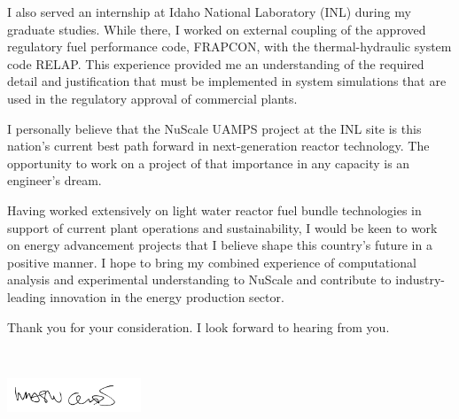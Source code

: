 \documentclass[11pt,letterpaper,roman]{moderncv}        %
\makeatletter
\renewcommand*{\makeletterclosing}{
	\@closing\\[0em]%
	{\includegraphics[width=4cm]{signature_childs}
		\par
		\bfseries \@firstname~\@lastname}%
		\\
	\ifthenelse{\isundefined{\@enclosure}}{}{%
		\vfill%
		{\color{color2}\itshape\enclname: \@enclosure}}}
\makeatother
\begin{document}
I also served an internship at Idaho National Laboratory (INL) during my graduate studies. While there, I worked on external coupling of the approved regulatory fuel performance code, FRAPCON, with the thermal-hydraulic system code RELAP. This experience provided me an understanding of the required detail and justification that must be implemented in system simulations that are used in the regulatory approval of commercial plants.

I personally believe that the NuScale UAMPS project at the INL site is this nation's current best path forward in next-generation reactor technology. The opportunity to work on a project of that importance in any capacity is an engineer's dream.

Having worked extensively on light water reactor fuel bundle technologies in support of current plant operations and sustainability, I would be keen to work on energy advancement projects that I believe shape this country’s future in a positive manner. I hope to bring my combined experience of computational analysis and experimental understanding to NuScale and contribute to industry-leading innovation in the energy production sector.


Thank you for your consideration. I look forward to hearing from you.

\makeletterclosing
\end{document}
